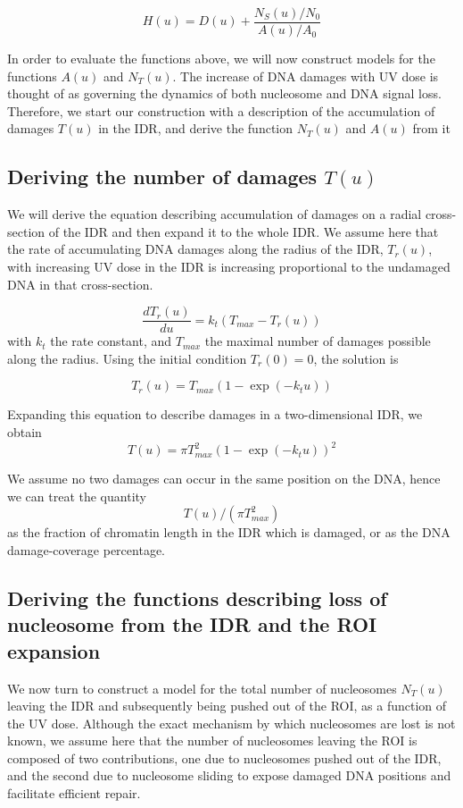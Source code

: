 \documentclass[12pt]{article}
\begin{document}
	\begin{equation}\label{eq:nucleosomeStst}
	H(u) = D(u) + \frac{N_S(u)/N_0}{A(u)/A_0}	
	\end{equation}
	
	In order to evaluate the functions above, we will now construct models
	for the functions $A(u)$ and $N_T(u)$. The increase of DNA damages with UV
	dose is thought of as governing the dynamics of both nucleosome and DNA
	signal loss. Therefore, we start our construction with a description of the
	accumulation of damages $T(u)$ in the IDR, and derive the function $N_T(u)$
	and $A(u)$ from it
	
	\subsection{Deriving the number of damages $T(u)$}
	
	We will derive the equation describing accumulation of damages on a radial
	cross-section of the IDR and then expand it to the whole IDR. We assume
	here that the rate of accumulating DNA damages along the radius of the
	IDR, $T_r(u)$, with increasing UV dose in the IDR is increasing proportional
	to the undamaged DNA in that cross-section.
	
	\begin{equation*}
	\frac{dT_r(u)}{du} = k_t(T_{max} - T_r(u))
	\end{equation*}	
	with $k_t$ the rate constant, and $T_{max}$ the maximal number of damages possible
	along the radius. Using the initial condition $T_r(0) = 0$, the solution is
	
	\begin{equation*}
	T_r(u) = T_{max}(1-\exp(−k_tu))
	\end{equation*}
	
	Expanding this equation to describe damages in a two-dimensional IDR, we
	obtain
	\begin{equation}\label{eq:damagesIDR}
	T(u) = \pi T_{max}^2 (1-\exp(−k_tu))^2
	\end{equation}
	
	We assume no two damages can occur in the same position on the DNA,
	hence we can treat the quantity
	\begin{equation*}
	T(u)/(\pi T_{max}^2)
	\end{equation*}
	as the fraction of chromatin length in the IDR which is damaged, or as the
	DNA damage-coverage percentage.
	
	\subsection{Deriving the functions describing loss of nucleosome from the IDR and the ROI expansion}
	We now turn to construct a model for the total number of nucleosomes $N_T(u)$
	leaving the IDR and subsequently being pushed out of the ROI, as a function
	of the UV dose. Although the exact mechanism by which nucleosomes are
	lost is not known, we assume here that the number of nucleosomes leaving
	the ROI is composed of two contributions, one due to nucleosomes pushed
	out of the IDR, and the second due to nucleosome sliding to expose damaged
	DNA positions and facilitate efficient repair.
	
\end{document}
